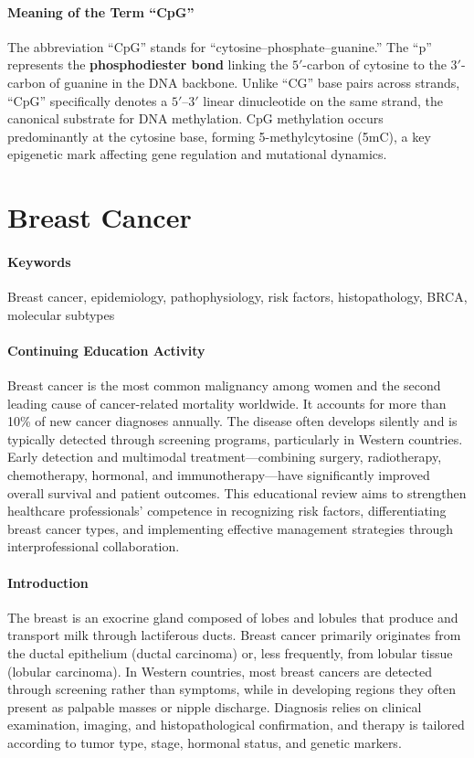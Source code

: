 \documentclass[10pt]{extarticle}
\begin{document}
\paragraph{Meaning of the Term “CpG”}
The abbreviation “CpG” stands for “cytosine–phosphate–guanine.” The “p” represents the \textbf{phosphodiester bond} linking the $5'$-carbon of cytosine to the $3'$-carbon of guanine in the DNA backbone. Unlike “CG” base pairs across strands, “CpG” specifically denotes a $5'$–$3'$ linear dinucleotide on the same strand, the canonical substrate for DNA methylation. CpG methylation occurs predominantly at the cytosine base, forming 5-methylcytosine (5mC), a key epigenetic mark affecting gene regulation and mutational dynamics.




\section{Breast Cancer}

\paragraph{Keywords} Breast cancer, epidemiology, pathophysiology, risk factors, histopathology, BRCA, molecular subtypes \cite{menon2025breast}

\paragraph{Continuing Education Activity}
Breast cancer is the most common malignancy among women and the second leading cause of cancer-related mortality worldwide. It accounts for more than 10\% of new cancer diagnoses annually. The disease often develops silently and is typically detected through screening programs, particularly in Western countries. Early detection and multimodal treatment—combining surgery, radiotherapy, chemotherapy, hormonal, and immunotherapy—have significantly improved overall survival and patient outcomes. This educational review aims to strengthen healthcare professionals’ competence in recognizing risk factors, differentiating breast cancer types, and implementing effective management strategies through interprofessional collaboration.

\paragraph{Introduction}
The breast is an exocrine gland composed of lobes and lobules that produce and transport milk through lactiferous ducts. Breast cancer primarily originates from the ductal epithelium (ductal carcinoma) or, less frequently, from lobular tissue (lobular carcinoma). In Western countries, most breast cancers are detected through screening rather than symptoms, while in developing regions they often present as palpable masses or nipple discharge. Diagnosis relies on clinical examination, imaging, and histopathological confirmation, and therapy is tailored according to tumor type, stage, hormonal status, and genetic markers.
\end{document}
